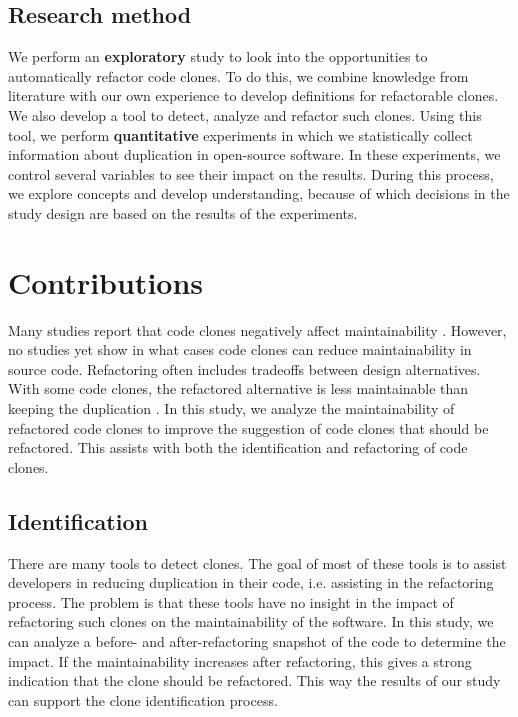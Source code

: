 \subsection{Research method}
We perform an \textbf{exploratory} study to look into the opportunities to automatically refactor code clones. To do this, we combine knowledge from literature with our own experience to develop definitions for refactorable clones. We also develop a tool to detect, analyze and refactor such clones. Using this tool, we perform \textbf{quantitative} experiments in which we statistically collect information about duplication in open-source software. In these experiments, we control several variables to see their impact on the results. During this process, we explore concepts and develop understanding, because of which decisions in the study design are based on the results of the experiments.

\section{Contributions}
Many studies report that code clones negatively affect maintainability \cite{heitlager2007practical, monden2002software, juergens2009code, chatterji2013effects}. However, no studies yet show in what cases code clones can reduce maintainability in source code. Refactoring often includes tradeoffs between design alternatives. With some code clones, the refactored alternative is less maintainable than keeping the duplication \cite{kapser2006cloning, aversano2007clones, hotta2010duplicate, kim2005empirical, krinke2007study, saha2010evaluating}. In this study, we analyze the maintainability of refactored code clones to improve the suggestion of code clones that should be refactored. This assists with both the identification and refactoring of code clones.

\subsection{Identification}
There are many tools to detect clones. The goal of most of these tools is to assist developers in reducing duplication in their code, i.e. assisting in the refactoring process. The problem is that these tools have no insight in the impact of refactoring such clones on the maintainability of the software. In this study, we can analyze a before- and after-refactoring snapshot of the code to determine the impact. If the maintainability increases after refactoring, this gives a strong indication that the clone should be refactored. This way the results of our study can support the clone identification process.

